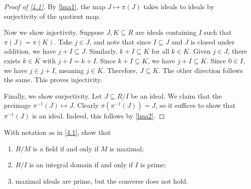 \documentclass[11pt, letterpaper]{article}
\begin{document}
\begin{proof}[Proof of \cref{4.1}]
	By \cref{lma1}, the map $J\mapsto \pi (J)$ takes ideals to ideals by surjectivity of the quotient map.

	Now we show injectivity. Suppose $J,K\subseteq R$ are ideals containing $I$ such that $\pi (J)=\pi (K)$. Take $j\in J$, and note that since $I\subseteq J$ and $J$ is closed under addition, we have $j+I \subseteq J$. Similarly,  $k+I \subseteq K$ for all $k\in K$. Given $j\in J$, there exists $k\in K$ with $j+I = k+I$. Since $k+I \subseteq K$, we have $j+I \subseteq K$. Since $0\in I$, we have $j\in j+I$, meaning $j\in K$. Therefore, $J\subseteq K$. The other direction follows the same. This proves injectivity.

	Finally, we show surjectivity. Let $J\subseteq R/I$ be an ideal. We claim that the preimage $\pi ^{-1} (J)\mapsto J$. Clearly $\pi (\pi^{-1} (J))=J$, so it suffices to show that $\pi ^{-1} (J)$ is an ideal. Indeed, this follows by \cref{lma2}.
\end{proof}
\begin{problem}\label{4.2}
	With notation as in \cref{4.1}, show that
	\begin{enumerate}
		\item $R/M$ is a field if and only if $M$ is maximal;
		\item $R/I$ is an integral domain if and only if $I$ is prime;
		\item maximal ideals are prime, but the converse does not hold.
	\end{enumerate}
\end{problem}
\end{document}

